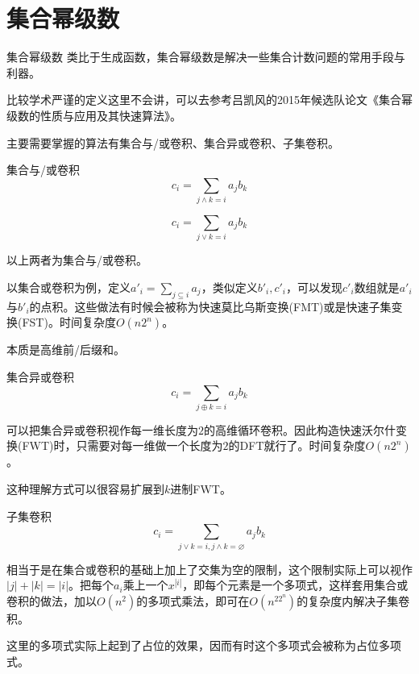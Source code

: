 \documentclass{beamer}
\begin{document}
	\section{集合幂级数}
	\begin{frame}{集合幂级数}
		类比于生成函数，集合幂级数是解决一些集合计数问题的常用手段与利器。
		
		比较学术严谨的定义这里不会讲，可以去参考吕凯风的2015年候选队论文《集合幂级数的性质与应用及其快速算法》。
		
		主要需要掌握的算法有集合与/或卷积、集合异或卷积、子集卷积。
	\end{frame}
	\begin{frame}{集合与/或卷积}
		$$c_i=\sum_{j\land k = i}a_jb_k$$
		
		$$c_i=\sum_{j\lor k = i}a_jb_k$$
		
		以上两者为集合与/或卷积。
		
		以集合或卷积为例，定义$a'_i=\sum_{j \subseteq i}a_j$，类似定义$b'_i,c'_i$，可以发现$c'_i$数组就是$a'_i$与$b'_i$的点积。这些做法有时候会被称为快速莫比乌斯变换(FMT)或是快速子集变换(FST)。时间复杂度$O(n2^n)$。
		
		本质是高维前/后缀和。
	\end{frame}
	\begin{frame}{集合异或卷积}
		$$c_i=\sum_{j \oplus k = i}a_jb_k$$
		
		可以把集合异或卷积视作每一维长度为$2$的高维循环卷积。因此构造快速沃尔什变换(FWT)时，只需要对每一维做一个长度为$2$的DFT就行了。时间复杂度$O(n2^n)$。
		
		这种理解方式可以很容易扩展到$k$进制FWT。
	\end{frame}
	\begin{frame}{子集卷积}
		$$c_i=\sum_{j\lor k = i,j \land k = \varnothing}a_jb_k$$
		
		相当于是在集合或卷积的基础上加上了交集为空的限制，这个限制实际上可以视作$|j|+|k|=|i|$。把每个$a_i$乘上一个$x^{|i|}$，即每个元素是一个多项式，这样套用集合或卷积的做法，加以$O(n^2)$的多项式乘法，即可在$O(n^22^n)$的复杂度内解决子集卷积。
		
		这里的多项式实际上起到了占位的效果，因而有时这个多项式会被称为占位多项式。
	\end{frame}
	
\end{document}
